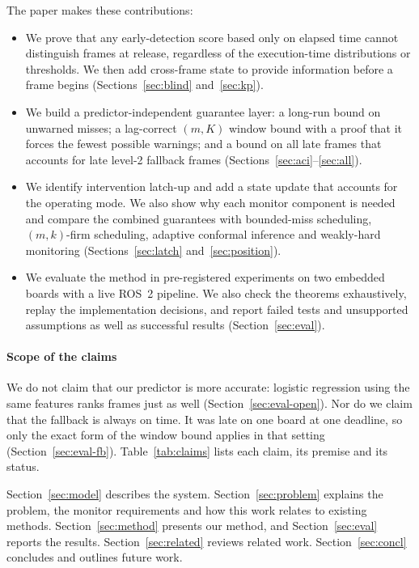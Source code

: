 \documentclass[acmsmall,screen]{acmart}
\begin{document}
The paper makes these contributions:
\begin{itemize}
\item We prove that any early-detection score based only on elapsed time cannot distinguish frames at release, regardless of the execution-time distributions or thresholds. We then add cross-frame state to provide information before a frame begins (Sections~\ref{sec:blind} and~\ref{sec:kp}).
\item We build a predictor-independent guarantee layer: a long-run bound on unwarned misses; a lag-correct $(m,K)$ window bound with a proof that it forces the fewest possible warnings; and a bound on all late frames that accounts for late level-2 fallback frames (Sections~\ref{sec:aci}--\ref{sec:all}).
\item We identify intervention latch-up and add a state update that accounts for the operating mode. We also show why each monitor component is needed and compare the combined guarantees with bounded-miss scheduling, $(m,k)$-firm scheduling, adaptive conformal inference and weakly-hard monitoring (Sections~\ref{sec:latch} and~\ref{sec:position}).
\item We evaluate the method in pre-registered experiments on two embedded boards with a live ROS~2 pipeline. We also check the theorems exhaustively, replay the implementation decisions, and report failed tests and unsupported assumptions as well as successful results (Section~\ref{sec:eval}).
\end{itemize}

\paragraph{Scope of the claims} We do not claim that our predictor is more accurate: logistic regression using the same features ranks frames just as well (Section~\ref{sec:eval-open}). Nor do we claim that the fallback is always on time. It was late on one board at one deadline, so only the exact form of the window bound applies in that setting (Section~\ref{sec:eval-fb}). Table~\ref{tab:claims} lists each claim, its premise and its status.

Section~\ref{sec:model} describes the system. Section~\ref{sec:problem} explains the problem, the monitor requirements and how this work relates to existing methods. Section~\ref{sec:method} presents our method, and Section~\ref{sec:eval} reports the results. Section~\ref{sec:related} reviews related work. Section~\ref{sec:concl} concludes and outlines future work.
\end{document}
